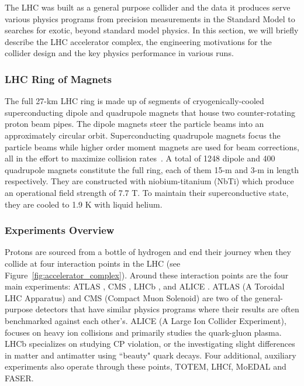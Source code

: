 The LHC was built as a general purpose collider and the data it produces serve various physics programs from precision measurements in the Standard Model to searches for exotic, beyond standard model physics. In this section, we will briefly describe the LHC accelerator complex, the engineering motivations for the collider design and the key physics performance in various runs.

\subsubsection{LHC Ring of Magnets}
The full 27-km LHC ring is made up of segments of cryogenically-cooled superconducting dipole and quadrupole magnets that house two counter-rotating proton beam pipes. The dipole magnets steer the particle beams into an approximately circular orbit. Superconducting quadrupole magnets focus the particle beams while higher order moment magnets are used for beam corrections, all in the effort to maximize collision rates~\cite{Rossi:2002ye}. A total of 1248 dipole and 400 quadrupole magnets constitute the full ring, each of them 15-m and 3-m in length respectively. They are constructed with niobium-titanium (NbTi) which produce an operational field strength of 7.7 T. To maintain their superconductive state, they are cooled to 1.9 K with liquid helium.

\subsubsection{Experiments Overview}
 
 Protons are sourced from a bottle of hydrogen and end their journey when they collide at four interaction points in the LHC (see Figure~\ref{fig:accelerator_complex}). Around these interaction points are the four main experiments: ATLAS \cite{ATLAS:2008xda}, CMS \cite{CMS:2008xjf}, LHCb \cite{LHCb:2008vvz}, and ALICE \cite{ALICE:2008ngc}. ATLAS (A Toroidal LHC Apparatus) and CMS (Compact Muon Solenoid) are two of the general-purpose detectors that have similar physics programs where their results are often benchmarked against each other's. ALICE (A Large Ion Collider Experiment), focuses on heavy ion collisions and primarily studies the quark-gluon plasma. LHCb specializes on studying CP violation, or the investigating slight differences in matter and antimatter using ``beauty" quark decays. Four additional, auxiliary experiments also operate through these points, TOTEM, LHCf, MoEDAL and FASER.  

